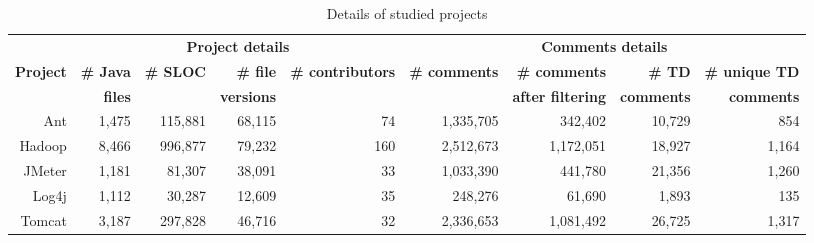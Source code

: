 \begin{table*}[tb]
  \caption{Details of studied projects}
  \label{tab:projects}
  \centering

  \begin{tabular}{r|rrrr|rrrr}
  \hline
\textbf{} & \multicolumn{4}{c|}{\textbf{Project details}} & \multicolumn{4}{c}{\textbf{Comments details}} \\ \cline{2-9}
\textbf{Project} & \textbf{\# Java} & \textbf{\# SLOC} & \textbf{\# file} & \textbf{\# contributors} & \textbf{\# comments} & \textbf{\# comments} & \textbf{\# TD} & \textbf{\# unique TD} \\
\textbf{} & \textbf{files} & & \textbf{versions} & & & \textbf{after filtering} & \textbf{ comments} & \textbf{comments} \\
  \hline
Ant        &1,475 & 115,881 & 68,115 & 74 & 1,335,705 & 342,402 & 10,729 &  854  \\
Hadoop     &8,466 & 996,877 & 79,232 &160 & 2,512,673 & 1,172,051 & 18,927 & 1,164 \\
JMeter     &1,181 & 81,307  & 38,091 & 33 & 1,033,390 & 441,780 & 21,356 & 1,260 \\
Log4j      &1,112 & 30,287  & 12,609 & 35 &   248,276 &  61,690 &  1,893 &   135 \\
Tomcat     &3,187 & 297,828 & 46,716 & 32 & 2,336,653 & 1,081,492 & 26,725 & 1,317 \\
  \hline
  \end{tabular}
\end{table*}
